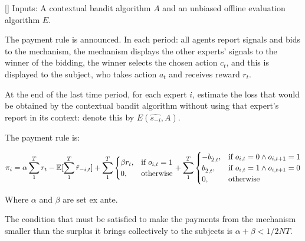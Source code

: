 \begin{mech}\label{mech:bidbandit}[]
Inputs: A contextual bandit algorithm $A$ and an unbiased offline evaluation algorithm $E$.


The payment rule is announced.
 In each period: all agents report signals and bids to the mechanism, the mechanism displays the other experts' signals to the winner of the bidding, the winner selects the chosen action $c_t$, and this is displayed to the subject, who takes action $a_t$ and receives reward $r_t$.

At the end of the last time period, for each expert $i$, estimate the loss that would be obtained by the contextual bandit algorithm without using that expert's report in its context: denote this by $E(\hat{s_{-i}},A)$.



The payment rule is:

\[
    \pi_i = 
\alpha \sum_1^T r_t -  \expec[\sum_1^T \hat{r}_{-i,t}]
+
\sum_1^T
\begin{cases}
    \beta r_t ,& \text{if } o_{i,t} = 1\\
     0,              & \text{otherwise}
\end{cases}
+
\sum_1^T
\begin{cases}
     - b_{\hat{2},t} ,& \text{if } o_{i,t} = 0 \land o_{i,t+1} = 1\\
       b_{\hat{2},t} ,& \text{if } o_{i,t} = 1 \land o_{i,t+1} = 0 \\
	   0,              & \text{otherwise}
\end{cases}
\]

Where $\alpha$ and $\beta$ are set ex ante. 
\end{mech}


The condition that must be satisfied to make the payments from the mechanism smaller than the surplus it brings collectively to the subjects is $ \alpha + \beta < 1/2NT$.




